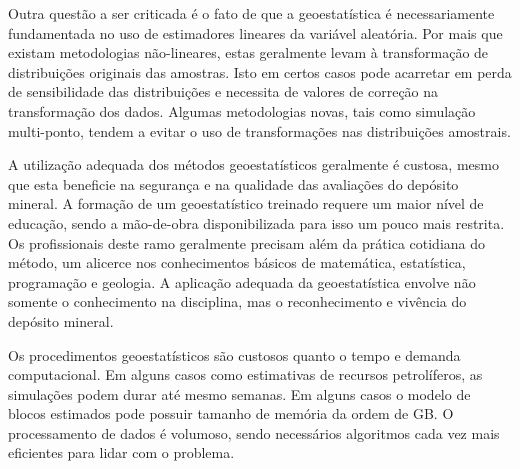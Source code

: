  Outra questão a ser criticada é o fato de que a geoestatística é necessariamente fundamentada no uso de estimadores lineares da variável aleatória. Por mais que existam metodologias não-lineares, estas geralmente levam à transformação de distribuições originais das amostras. Isto em certos casos pode acarretar em perda de sensibilidade das distribuições e necessita de valores de correção na transformação dos dados. Algumas metodologias novas, tais como simulação multi-ponto, tendem a evitar o uso de transformações nas distribuições amostrais.
 

 
 A utilização adequada dos métodos geoestatísticos geralmente é custosa, mesmo que esta beneficie na segurança e na qualidade das avaliações do depósito mineral. A formação de um geoestatístico treinado requere um maior nível de educação, sendo a mão-de-obra disponibilizada para isso um pouco mais restrita. Os profissionais deste ramo geralmente precisam além da prática cotidiana do método, um alicerce nos conhecimentos básicos de matemática, estatística, programação e geologia. A aplicação adequada da geoestatística envolve não somente o conhecimento na disciplina, mas o reconhecimento e vivência do depósito mineral.  
 
 Os procedimentos geoestatísticos são custosos quanto o tempo e demanda computacional. Em alguns casos como estimativas de recursos petrolíferos, as simulações podem durar até mesmo semanas. Em alguns casos o modelo de blocos estimados pode possuir tamanho de memória da ordem de GB. O processamento de dados é volumoso, sendo necessários algoritmos cada vez mais eficientes para lidar com o problema.  